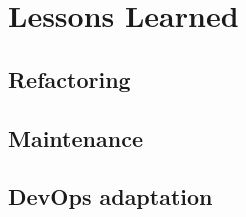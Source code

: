 \section{Lessons Learned}
\label{sec:lessons_learned}

\subsection{Refactoring}


\subsection{Maintenance}


\subsection{DevOps adaptation}

